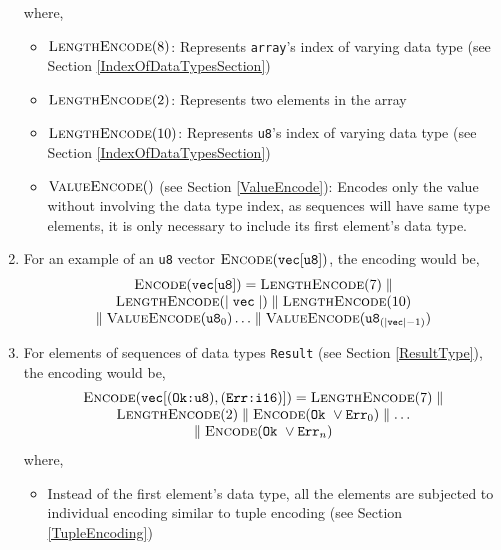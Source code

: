 \documentclass[../alan-handbook.tex]{subfiles}
\begin{document}
\begin{enumerate}
            where,
            \begin{itemize}
                \item  $\Call{LengthEncode}{8}$: Represents \texttt{array}'s index of varying data type (see Section \ref{IndexOfDataTypesSection})
                \item $\Call{LengthEncode}{2}$: Represents two elements in the array 
                \item $\Call{LengthEncode}{10}$: Represents \texttt{u8}'s index of varying data type (see Section \ref{IndexOfDataTypesSection})
                \item $\Call{ValueEncode}$ (see Section \ref{ValueEncode}): Encodes only the value without involving the data type index, as sequences will have same type elements, it is only necessary to include its first element's data type.
            \end{itemize}
        \item For an example of an \texttt{u8} vector $\Call{Encode}{\texttt{vec}[\texttt{u8}]}$, the encoding would be,
            $$
            \begin{matrix}
                \Call{Encode}{\texttt{vec}[\texttt{u8}]} = \Call{LengthEncode}{7} \parallel \\ 
                \Call{LengthEncode}{\mid \texttt{vec} \mid}  \parallel \Call{LengthEncode}{10} \\
                \parallel \Call{ValueEncode}{\texttt{u8}_0} \ldots \parallel \Call{ValueEncode}{\texttt{u8}_{(\mid \texttt{vec} \mid -1)}}
            \end{matrix}
            $$
        \item For elements of sequences of data types \texttt{Result} (see Section \ref{ResultType}), the encoding would be,
            $$
            \begin{matrix}
                \Call{Encode}{\texttt{vec}[(\texttt{Ok:u8}),(\texttt{Err:i16})]} = \Call{LengthEncode}{7} \parallel \\ 
                \Call{LengthEncode}{2} \parallel \Call{Encode}{{\texttt{Ok} \ \vee \texttt{Err}}_0} \parallel \ldots \\ 
                \parallel \Call{Encode}{{\texttt{Ok} \ \vee \texttt{Err}}_n}
            \end{matrix}
            $$
            where,
            \begin{itemize}
                \item Instead of the first element's data type, all the elements are subjected to individual encoding similar to tuple encoding (see Section \ref{TupleEncoding})

\end{itemize}
\end{enumerate}
\end{document}
